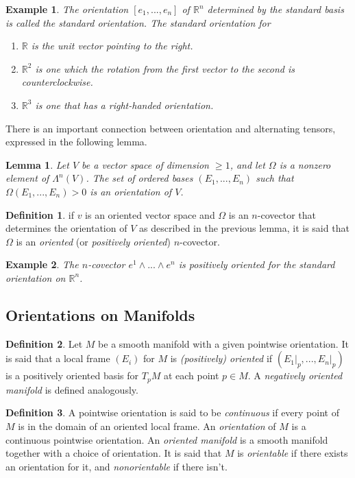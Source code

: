 \documentclass{article}
\newtheorem{lemma}[theorem]{Lemma}
\newtheorem{example}{Example}[section]
\theoremstyle{remark}
\theoremstyle{definition}
\newtheorem{definition}{Definition}[section]
\begin{document}
    \begin{example}
    The orientation $[e_1, ..., e_n]$ of $\mathbb{R}^n$ determined by the standard basis is called the \textit{standard orientation}. The standard orientation for
    \begin{enumerate}
        \item $\mathbb{R}$ is the unit vector pointing to the right. 
        \item $\mathbb{R}^2$ is one which the rotation from the first vector to the second is counterclockwise. 
        \item $\mathbb{R}^3$ is one that has a right-handed orientation. 
    \end{enumerate}
    \end{example}

    There is an important connection between orientation and alternating tensors, expressed in the following lemma. 

    \begin{lemma}
    Let $V$ be a vector space of dimension $\geq 1$, and let $\Omega$ is a nonzero element of $\Lambda^n (V)$. The set of ordered bases $(E_1, ..., E_n)$ such that $\Omega (E_1, ..., E_n) > 0$ is an orientation of $V$. 
    \end{lemma}

    \begin{definition}
    if $v$ is an oriented vector space and $\Omega$ is an $n$-covector that determines the orientation of $V$ as described in the previous lemma, it is said that $\Omega$ is an \textit{oriented} (or \textit{positively oriented}) $n$-covector. 
    \end{definition}

    \begin{example}
    The $n$-covector $e^1 \wedge ... \wedge e^n$ is positively oriented for the standard orientation on $\mathbb{R}^n$. 
    \end{example}

  \subsection{Orientations on Manifolds}

    \begin{definition}
    Let $M$ be a smooth manifold with a given pointwise orientation. It is said that a local frame $(E_i)$ for $M$ is \textit{(positively) oriented} if $(E_1 \big|_p, ..., E_n \big|_p)$ is a positively oriented basis for $T_p M$ at each point $p \in M$. A \textit{negatively oriented manifold} is defined analogously. 
    \end{definition}

    \begin{definition}
    A pointwise orientation is said to be \textit{continuous} if every point of $M$ is in the domain of an oriented local frame. An \textit{orientation} of $M$ is a continuous pointwise orientation. An \textit{oriented manifold} is a smooth manifold together with a choice of orientation. It is said that $M$ is \textit{orientable} if there exists an orientation for it, and \textit{nonorientable} if there isn't. 
    \end{definition}
\end{document}

